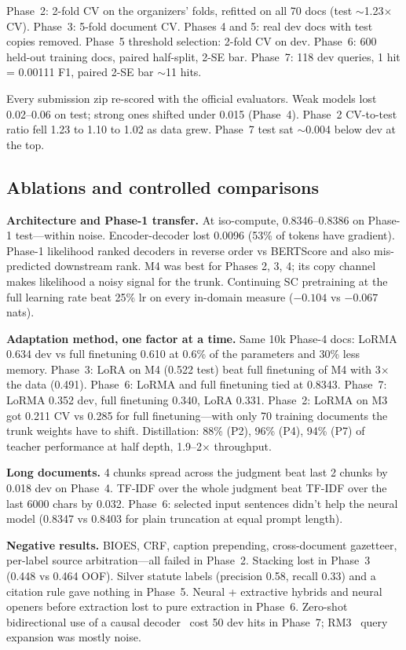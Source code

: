 \documentclass[11pt, oneside]{article}
\begin{document}
Phase~2: 2-fold CV on the organizers' folds, refitted on all 70 docs (test $\sim$1.23$\times$ CV).
Phase~3: 5-fold document CV. Phases 4 and 5: real dev docs with test copies removed. Phase~5 threshold
selection: 2-fold CV on dev. Phase~6: 600 held-out training docs, paired half-split, 2-SE bar. Phase~7:
118 dev queries, 1 hit = 0.00111 F1, paired 2-SE bar $\sim$11 hits.

Every submission zip re-scored with the official evaluators. Weak models lost 0.02--0.06 on test; strong
ones shifted under 0.015 (Phase~4). Phase~2 CV-to-test ratio fell 1.23 to 1.10 to 1.02 as data grew.
Phase~7 test sat $\sim$0.004 below dev at the top.

\subsection{Ablations and controlled comparisons}
\label{sec:ablate}
\textbf{Architecture and Phase-1 transfer.} At iso-compute, 0.8346--0.8386 on Phase-1 test---within
noise. Encoder-decoder lost 0.0096 (53\% of tokens have gradient). Phase-1 likelihood ranked decoders in
reverse order vs BERTScore and also mis-predicted downstream rank. M4 was best for Phases 2, 3, 4; its
copy channel makes likelihood a noisy signal for the trunk. Continuing SC pretraining at the full
learning rate beat 25\% lr on every in-domain measure ($-0.104$ vs $-0.067$ nats).

\textbf{Adaptation method, one factor at a time.} Same 10k Phase-4 docs: LoRMA 0.634 dev vs full
finetuning 0.610 at 0.6\% of the parameters and 30\% less memory. Phase~3: LoRA on M4 (0.522 test) beat
full finetuning of M4 with 3$\times$ the data (0.491). Phase~6: LoRMA and full finetuning tied at 0.8343.
Phase~7: LoRMA 0.352 dev, full finetuning 0.340, LoRA 0.331. Phase~2: LoRMA on M3 got 0.211 CV vs 0.285
for full finetuning---with only 70 training documents the trunk weights have to shift. Distillation: 88\%
(P2), 96\% (P4), 94\% (P7) of teacher performance at half depth, 1.9--2$\times$ throughput.

\textbf{Long documents.} 4 chunks spread across the judgment beat last 2 chunks by 0.018 dev on
Phase~4. TF-IDF over the whole judgment beat TF-IDF over the last 6000 chars by 0.032. Phase~6: selected
input sentences didn't help the neural model (0.8347 vs 0.8403 for plain truncation at equal prompt
length).

\textbf{Negative results.} BIOES, CRF, caption prepending, cross-document gazetteer, per-label source
arbitration---all failed in Phase~2. Stacking lost in Phase~3 (0.448 vs 0.464 OOF). Silver statute labels
(precision 0.58, recall 0.33) and a citation rule gave nothing in Phase~5. Neural + extractive hybrids
and neural openers before extraction lost to pure extraction in Phase~6. Zero-shot bidirectional use of a
causal decoder~\citep{behnamghader2024llm2vec} cost 50 dev hits in Phase~7; RM3~\citep{lavrenko2001rm}
query expansion was mostly noise.
\end{document}

